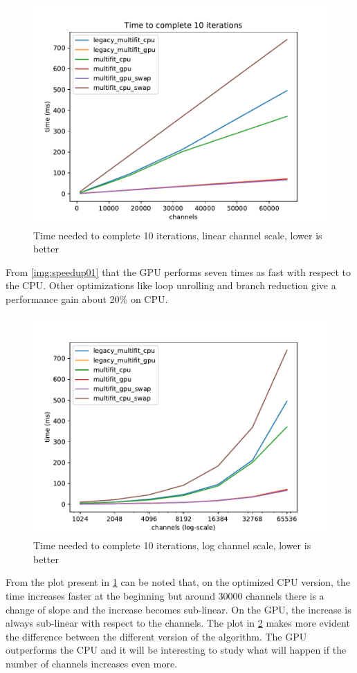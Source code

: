 \begin{figure}[H]
  \includegraphics[width=.75\textwidth]{img/linscale}
  \caption{Time needed to complete 10 iterations, linear channel scale, lower is better}
  \label{img:linscale01}
\end{figure}
From \ref{img:speedup01} that the GPU performs seven times as fast with respect to the CPU. Other optimizations like loop unrolling and branch reduction give a performance gain about 20\% on CPU.
\begin{figure}[H]
  \includegraphics[width=.75\textwidth]{img/logscale}
  \caption{Time needed to complete 10 iterations, log channel scale, lower is better}
  \label{img:logscale01}
\end{figure}
From the plot present in \ref{img:linscale01} can be noted that, on the optimized CPU version, the time increases faster at the beginning but around 30000 channels there is a change of slope and the increase becomes sub-linear. On the GPU, the increase is always sub-linear with respect to the channels.
The plot in \ref{img:logscale01} makes more evident the difference between the different version of the algorithm. The GPU outperforms the CPU and it will be interesting to study what will happen if the number of channels increases even more.\\
